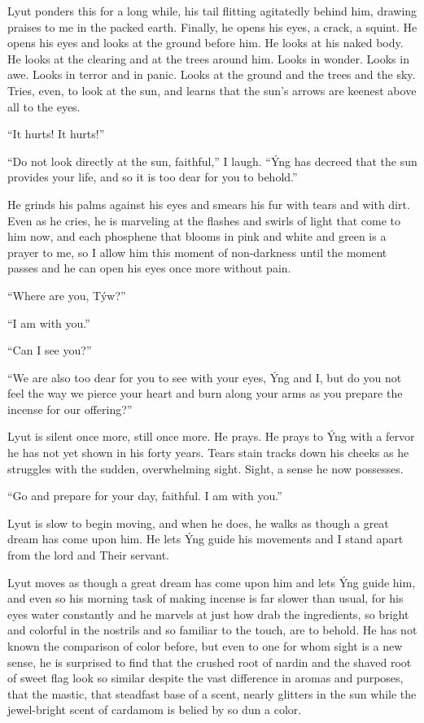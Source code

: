 Lyut ponders this for a long while, his tail flitting agitatedly behind him, drawing praises to me in the packed earth. Finally, he opens his eyes, a crack, a squint. He opens his eyes and looks at the ground before him. He looks at his naked body. He looks at the clearing and at the trees around him. Looks in wonder. Looks in awe. Looks in terror and in panic. Looks at the ground and the trees and the sky. Tries, even, to look at the sun, and learns that the sun's arrows are keenest above all to the eyes.

``It hurts! It hurts!''

``Do not look directly at the sun, faithful,'' I laugh. ``Ýng has decreed that the sun provides your life, and so it is too dear for you to behold.''

He grinds his palms against his eyes and smears his fur with tears and with dirt. Even as he cries, he is marveling at the flashes and swirls of light that come to him now, and each phosphene that blooms in pink and white and green is a prayer to me, so I allow him this moment of non-darkness until the moment passes and he can open his eyes once more without pain.

``Where are you, Týw?''

``I am with you.''

``Can I see you?''

``We are also too dear for you to see with your eyes, Ýng and I, but do you not feel the way we pierce your heart and burn along your arms as you prepare the incense for our offering?''

Lyut is silent once more, still once more. He prays. He prays to Ýng with a fervor he has not yet shown in his forty years. Tears stain tracks down his cheeks as he struggles with the sudden, overwhelming sight. Sight, a sense he now possesses.

``Go and prepare for your day, faithful. I am with you.''

\secdiv

\noindent Lyut is slow to begin moving, and when he does, he walks as though a great dream has come upon him. He lets Ýng guide his movements and I stand apart from the lord and Their servant.

Lyut moves as though a great dream has come upon him and lets Ýng guide him, and even so his morning task of making incense is far slower than usual, for his eyes water constantly and he marvels at just how drab the ingredients, so bright and colorful in the nostrils and so familiar to the touch, are to behold. He has not known the comparison of color before, but even to one for whom sight is a new sense, he is surprised to find that the crushed root of nardin and the shaved root of sweet flag look so similar despite the vast difference in aromas and purposes, that the mastic, that steadfast base of a scent, nearly glitters in the sun while the jewel-bright scent of cardamom is belied by so dun a color.

